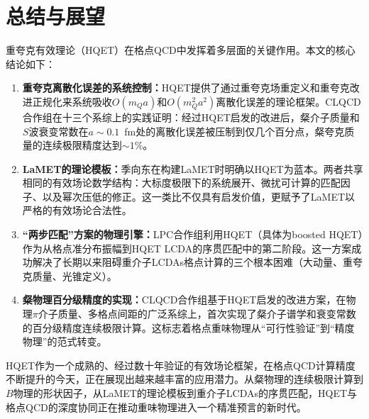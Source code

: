 \documentclass[12pt,a4paper]{ctexart}
\theoremstyle{definition}
\begin{document}
\section{总结与展望}

重夸克有效理论（HQET）在格点QCD中发挥着多层面的关键作用。本文的核心结论如下：

\begin{enumerate}
    \item \textbf{重夸克离散化误差的系统控制：}HQET提供了通过重夸克场重定义和重夸克改进正规化来系统吸收$O(m_Q a)$和$O(m^2_Q a^2)$离散化误差的理论框架。CLQCD合作组在十三个系综上的实践\cite{CLQCD2024charm}证明：经过HQET启发的改进后，粲介子质量和$S$波衰变常数在$a \sim 0.1$~fm处的离散化误差被压制到仅几个百分点，粲夸克质量的连续极限精度达到$\sim 1\%$。

    \item \textbf{LaMET的理论模板：}季向东在构建LaMET时明确以HQET为蓝本\cite{Ji2014LaMET}。两者共享相同的有效场论数学结构：大标度极限下的系统展开、微扰可计算的匹配因子、以及幂次压低的修正。这一类比不仅具有启发价值，更赋予了LaMET以严格的有效场论合法性。

    \item \textbf{``两步匹配''方案的物理引擎：}LPC合作组\cite{Han2025heavy}利用HQET（具体为boosted HQET）作为从格点准分布振幅到HQET LCDA的序贯匹配中的第二阶段。这一方案成功解决了长期以来阻碍重介子LCDAs格点计算的三个根本困难（大动量、重夸克质量、光锥定义）。

    \item \textbf{粲物理百分级精度的实现：}CLQCD合作组\cite{CLQCD2024charm,CLQCD2025quark_mass}基于HQET启发的改进方案，在物理$\pi$介子质量、多格点间距的广泛系综上，首次实现了粲介子谱学和衰变常数的百分级精度连续极限计算。这标志着格点重味物理从``可行性验证''到``精度物理''的范式转变。
\end{enumerate}

HQET作为一个成熟的、经过数十年验证的有效场论框架，在格点QCD计算精度不断提升的今天，正在展现出越来越丰富的应用潜力。从粲物理的连续极限计算到$B$物理的形状因子，从LaMET的理论模板到重介子LCDAs的序贯匹配，HQET与格点QCD的深度协同正在推动重味物理进入一个精准预言的新时代。
\end{document}
